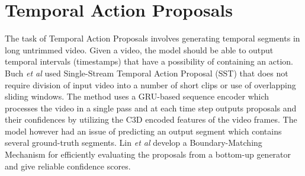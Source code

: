 \section{Temporal Action Proposals}
\par The task of Temporal Action Proposals involves generating temporal segments in long untrimmed video. Given a video, the model should be able to output temporal intervals (timestamps) that have a possibility of containing an action. Buch \textit{et al} \cite{buch2017sst} used Single-Stream Temporal Action Proposal (SST) that does not require division of input video into a number of short clips or use of overlapping sliding windows. The method uses a GRU-based sequence encoder which processes the video in a single pass and at each time step outputs proposals and their confidences by utilizing the C3D encoded features of the video frames. The model however had an issue of predicting an output segment which contains several ground-truth segments. Lin \textit{et al} \cite{lin2019bmn} develop a Boundary-Matching Mechanism for efficiently evaluating the proposals from a bottom-up generator and give reliable confidence scores.

